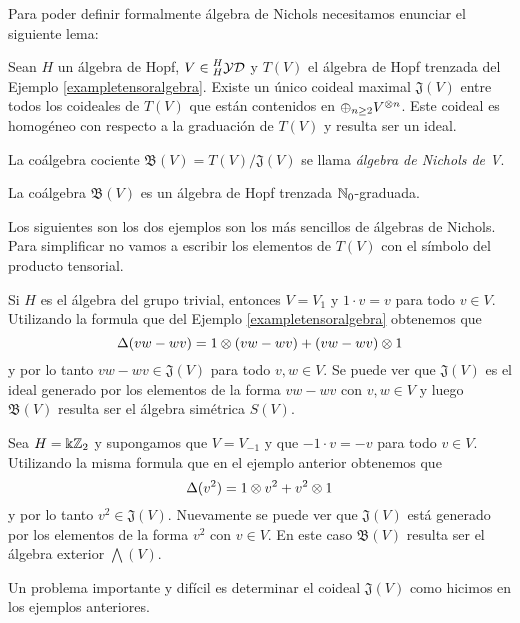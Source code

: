 \documentclass[a4paper,oneside,fleqn,11pt,../tesis.tex]{subfiles}
\newcommand{\yetter}{\prescript{H}{H}{\mathcal{YD}}}
\begin{document}
Para poder definir formalmente álgebra de Nichols necesitamos enunciar el siguiente lema:
\begin{lema}
	Sean $H$ un álgebra de Hopf, $V \in \yetter$ y $T(V)$ el álgebra de Hopf trenzada del Ejemplo \ref{exampletensoralgebra}.
	Existe un único coideal maximal $\mathfrak{J}(V)$ entre todos los coideales de $T(V)$ que están contenidos en $\oplus_{n \geq 2}V^{\otimes n}$. Este coideal es homogéneo con respecto a la graduación de $T(V)$ y resulta ser un ideal.
\end{lema}

\begin{definition}
	La coálgebra cociente $\mathfrak{B}(V) = T(V)/\mathfrak{J}(V)$ se llama \emph{álgebra de Nichols de V}.
\end{definition}

\begin{Teorema}
	La coálgebra $\mathfrak{B}(V)$ es un álgebra de Hopf trenzada $\mathbb{N}_{0}$-graduada.
\end{Teorema}

Los siguientes son los dos ejemplos son los más sencillos de álgebras de Nichols. Para simplificar
no vamos a escribir los elementos de $T(V)$ con el símbolo del producto tensorial.
\begin{example}
	Si $H$ es el álgebra del grupo trivial, entonces $V = V_1$ y $1\cdot v = v$ para todo $v \in V$.
	Utilizando la formula que del Ejemplo \ref{exampletensoralgebra} obtenemos que
	\[
		\Delta(vw - wv) = 1\otimes (vw -wv) + (vw - wv)\otimes 1
	\]
	y por lo tanto $vw - wv \in \mathfrak{J}(V)$ para todo $v, w \in V$. Se puede ver que $\mathfrak{J}(V)$ es el ideal
	generado por los elementos de la forma $vw - wv$ con $v, w \in V$ y luego
	$\mathfrak{B}(V)$ resulta ser el álgebra simétrica $S(V)$.
\end{example}

\begin{example}
	Sea $H = \Bbbk \mathbb{Z}_{2}$ y supongamos que $V = V_{-1}$ y que $-1 \cdot v = -v$ para todo $v \in V$.
	Utilizando la misma formula que en el ejemplo anterior obtenemos que
	\[
		\Delta(v^2) = 1\otimes v^2 + v^2 \otimes 1
	\]
	y por lo tanto $v^2 \in \mathfrak{J}(V)$. Nuevamente se puede ver que $\mathfrak{J}(V)$
	está generado por los elementos de la forma $v^2$ con $v \in V$.
	En este caso $\mathfrak{B}(V)$ resulta ser el álgebra exterior $\bigwedge(V)$.
\end{example}
Un problema importante y difícil es determinar el coideal $\mathfrak{J}(V)$ como hicimos en los ejemplos
anteriores.
\end{document}
